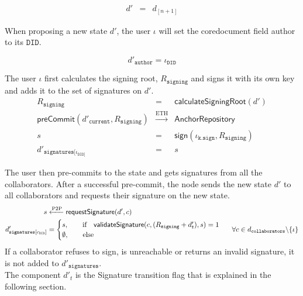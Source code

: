 \begin{eqnarray}
    d' & = & d_{[n+1]}
\end{eqnarray}

When proposing a new state $d'$, the user $\iota$ will set the coredocument field author to its $\mathtt{DID}$.

\begin{equation}
    {d'}_{\mathtt{author}} = \iota_{\mathtt{DID}}
\end{equation}

The user $\iota$ first calculates the signing root, $R_{\mathtt{signing}}$ and signs it with its own key and adds it to the set of signatures on $d'$.
\begin{eqnarray}
    R_{\mathtt{signing}} & = & \mathsf{calculateSigningRoot}(d') \\
        \mathsf{preCommit}(d'_\mathtt{current},R_{\mathtt{signing}}) &\xrightarrow[]{\text{ETH}} &  \mathsf{AnchorRepository} \\
     s & = & \mathsf{sign}(\iota_{\mathtt{k.sign}}, R_{\mathtt{signing}}) \\
    {d'}_{\mathtt{signatures}[\iota_{\mathtt{DID}]}} & = & s
\end{eqnarray}

The user then pre-commits to the state and gets signatures from all the collaborators. After a successful pre-commit, the node sends the new state $d'$ to all collaborators and requests their signature on the new state.
\begin{equation}
\begin{split}
s & \xleftarrow[]{\text{P2P}} \mathsf{requestSignature}(d', c) \qquad \qquad \qquad \\
d'_{\mathtt{signatures}[c_{\mathtt{DID}}]} & =  \begin{cases}
  s, \quad \quad \text{if} \quad \mathsf{validateSignature}(c, (R_{\mathtt{signing}}+d'_t), s)  = 1 \\      
  \emptyset,  \quad\quad\text{else} \\
\end{cases} \textcolor{white}{x}\forall c \in d_{\mathtt{collaborators}} \backslash \{\iota\}
\end{split}
\end{equation}
If a collaborator refuses to sign, is unreachable or returns an invalid signature, it is not added to $d'_{\mathtt{signatures}}$. \\
The component $d'_t$ is the Signature transition flag that is explained in the following section.
\begin{comment}
\begin{eqnarray}
    R_{\mathtt{doc-root}} = \mathsf{calculateDocumentRoot}(d') \\
    \mathsf{commit}(d'_{\mathtt{next-img}}, R_{\mathtt{doc-root}},M_{\texttt{proofs}}) \xrightarrow[]{\text{ETH}} \mathsf{AnchorRepository}
\end{eqnarray}
\end{comment}
